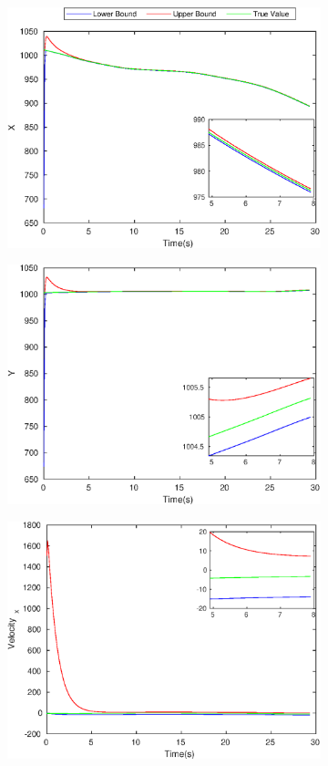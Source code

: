 \begin{figure}[h]
\begin{subfigure}{.5\linewidth}
\centering
\includegraphics[width=\linewidth]{figures/Prad/s3cspradX}
\end{subfigure}
\begin{subfigure}{.5\linewidth}
\centering
\includegraphics[width=\linewidth]{figures/Prad/s3cspradY}
\end{subfigure}
\begin{subfigure}{.5\linewidth}
\centering
\includegraphics[width=.9\linewidth]{figures/Prad/s3cspradVelocity_x}

\end{subfigure}
\end{figure}
